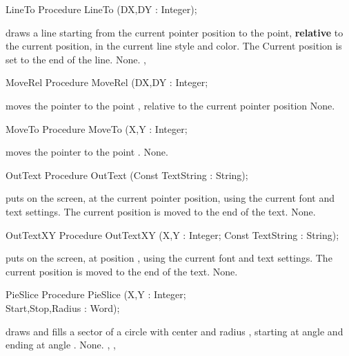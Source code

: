 \begin{procedure}{LineTo}
\Declaration
Procedure LineTo (DX,DY : Integer);

\Description
{} draws a line starting from
the current pointer position to the point, \textbf{relative} to the
current position, in the current line style and color. The Current position
is set to the end of the line.
\Errors
None.
\SeeAlso
{},
\end{procedure}

\begin{procedure}{MoveRel}
\Declaration
Procedure MoveRel (DX,DY : Integer;

\Description
{} moves the pointer to the
point , relative to the current pointer
position
\Errors
None.
\SeeAlso
{}
\end{procedure}

\begin{procedure}{MoveTo}
\Declaration
Procedure MoveTo (X,Y : Integer;

\Description
{} moves the pointer to the
point .
\Errors
None.
\SeeAlso
{}
\end{procedure}

\begin{procedure}{OutText}
\Declaration
Procedure OutText (Const TextString : String);

\Description
{} puts  on the screen, at the current pointer
position, using the current font and text settings. The current position is
moved to the end of the text.
\Errors
None.
\SeeAlso
{}
\end{procedure}

\begin{procedure}{OutTextXY}
\Declaration
Procedure OutTextXY (X,Y : Integer; Const TextString : String);

\Description
{} puts  on the screen, at position ,
using the current font and text settings. The current position is
moved to the end of the text.
\Errors
None.
\SeeAlso
{}
\end{procedure}

\begin{procedure}{PieSlice}
\Declaration
Procedure PieSlice (X,Y : Integer; \\ Start,Stop,Radius : Word);

\Description
{}
draws and fills a sector of a circle with center  and radius 
, starting at angle  and ending at angle .
\Errors
None.
\SeeAlso
{}, , 
\end{procedure}

